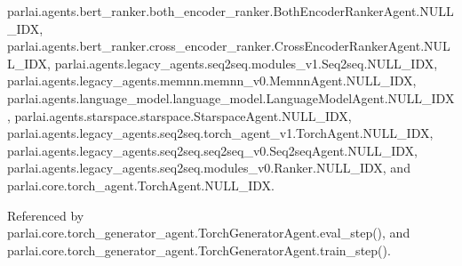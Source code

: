 parlai.\+agents.\+bert\+\_\+ranker.\+both\+\_\+encoder\+\_\+ranker.\+Both\+Encoder\+Ranker\+Agent.\+N\+U\+L\+L\+\_\+\+I\+DX, parlai.\+agents.\+bert\+\_\+ranker.\+cross\+\_\+encoder\+\_\+ranker.\+Cross\+Encoder\+Ranker\+Agent.\+N\+U\+L\+L\+\_\+\+I\+DX, parlai.\+agents.\+legacy\+\_\+agents.\+seq2seq.\+modules\+\_\+v1.\+Seq2seq.\+N\+U\+L\+L\+\_\+\+I\+DX, parlai.\+agents.\+legacy\+\_\+agents.\+memnn.\+memnn\+\_\+v0.\+Memnn\+Agent.\+N\+U\+L\+L\+\_\+\+I\+DX, parlai.\+agents.\+language\+\_\+model.\+language\+\_\+model.\+Language\+Model\+Agent.\+N\+U\+L\+L\+\_\+\+I\+DX, parlai.\+agents.\+starspace.\+starspace.\+Starspace\+Agent.\+N\+U\+L\+L\+\_\+\+I\+DX, parlai.\+agents.\+legacy\+\_\+agents.\+seq2seq.\+torch\+\_\+agent\+\_\+v1.\+Torch\+Agent.\+N\+U\+L\+L\+\_\+\+I\+DX, parlai.\+agents.\+legacy\+\_\+agents.\+seq2seq.\+seq2seq\+\_\+v0.\+Seq2seq\+Agent.\+N\+U\+L\+L\+\_\+\+I\+DX, parlai.\+agents.\+legacy\+\_\+agents.\+seq2seq.\+modules\+\_\+v0.\+Ranker.\+N\+U\+L\+L\+\_\+\+I\+DX, and parlai.\+core.\+torch\+\_\+agent.\+Torch\+Agent.\+N\+U\+L\+L\+\_\+\+I\+DX.



Referenced by parlai.\+core.\+torch\+\_\+generator\+\_\+agent.\+Torch\+Generator\+Agent.\+eval\+\_\+step(), and parlai.\+core.\+torch\+\_\+generator\+\_\+agent.\+Torch\+Generator\+Agent.\+train\+\_\+step().

